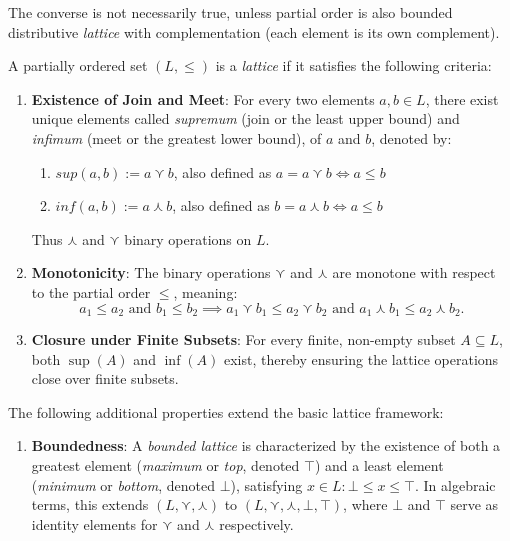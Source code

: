 The converse is not necessarily true, unless partial order is also bounded distributive \textit{lattice} with complementation (each element is its own complement). 

\begin{definition}\label{def_lattice_po}
  A partially ordered set \((L, \leq)\) is a \emph{lattice} if it satisfies the following criteria:
  \begin{enumerate}[label=(\roman*)]
    \item \textbf{Existence of Join and Meet}: For every two elements \(a, b \in L\), there exist unique elements called \textit{supremum} (join or the least upper bound) and \textit{infimum} (meet or the greatest lower bound), of $a$ and $b$, denoted by:      
    \begin{enumerate}[label=(\alph*)]
      \item $ sup(a,b) := a \curlyvee b$, also defined as $a = a \curlyvee b \Leftrightarrow a \leq b $
      \item $ inf(a,b) := a \curlywedge b$, also defined as $b = a \curlywedge b \Leftrightarrow a \leq b $
    \end{enumerate}
    Thus \(\curlywedge\) and \(\curlyvee\) binary operations on \(L\).
    
    \item \textbf{Monotonicity}: The binary operations \(\curlyvee\) and \(\curlywedge\) are monotone with respect to the partial order \(\leq\), meaning:
    \[
    a_1 \leq a_2 \text{ and } b_1 \leq b_2 \implies a_1 \curlyvee b_1 \leq a_2 \curlyvee b_2 \text{ and } a_1 \curlywedge b_1 \leq a_2 \curlywedge b_2.
    \]

    \item \textbf{Closure under Finite Subsets}: For every finite, non-empty subset \(A \subseteq L\), both \(\sup(A)\) and \(\inf(A)\) exist, thereby ensuring the lattice operations close over finite subsets.

  \end{enumerate}
    
  The following additional properties extend the basic lattice framework:  
  \begin{enumerate}[label=(\roman*), start=4]
    \item \textbf{Boundedness}: A \emph{bounded lattice} is characterized by the existence of both a greatest element (\emph{maximum} or \emph{top}, denoted $\top$) and a least element (\emph{minimum} or \emph{bottom}, denoted $\bot$), satisfying $x \in L: \bot \leq x \leq \top$.
    In algebraic terms, this extends $(L, \curlyvee, \curlywedge)$ to $(L, \curlyvee, \curlywedge, \bot, \top)$, where $\bot$ and $\top$ serve as identity elements for $\curlyvee$ and $\curlywedge$ respectively.


\end{enumerate}
\end{definition}
